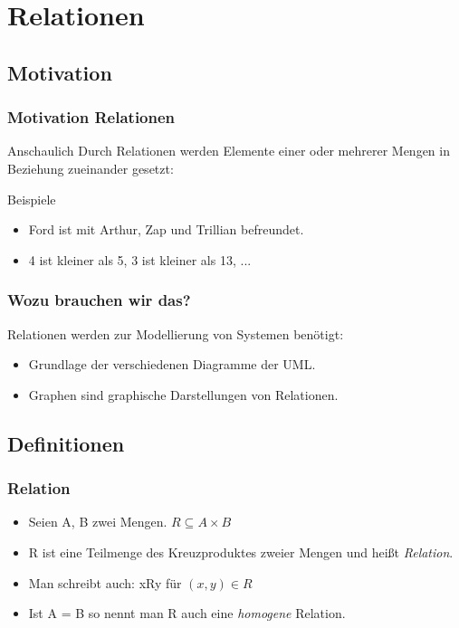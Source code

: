 \section{Relationen}
\subsection{Motivation}
\begin{frame}
	\frametitle{Motivation Relationen}
	\begin{alertblock}{Anschaulich}
		Durch Relationen werden Elemente einer oder mehrerer Mengen in Beziehung zueinander gesetzt:
	\end{alertblock}\pause
  \begin{exampleblock}{Beispiele}
		\begin{itemize}
			\item Ford ist mit Arthur, Zap und Trillian befreundet.
      \item 4 ist kleiner als 5, 3 ist kleiner als 13, ...
		\end{itemize}
  \end{exampleblock}
\end{frame}
\begin{frame}
	\frametitle{Wozu brauchen wir das?}
	\begin{block}{}
		Relationen werden zur Modellierung von Systemen benötigt: \pause
		\begin{itemize}
			\item Grundlage der verschiedenen Diagramme der UML.\pause
			\item Graphen sind graphische Darstellungen von Relationen.
		\end{itemize}
	\end{block}
\end{frame}

\subsection{Definitionen}
\begin{frame}
  \frametitle{Relation}
  \begin{definition}
    \begin{itemize}
      \item Seien A, B zwei Mengen. $ R \subseteq A \times B $
      \item R ist eine Teilmenge des Kreuzproduktes zweier Mengen und heißt \emph{Relation}.
      \item Man schreibt auch: xRy für $(x, y) \in R$
      \item Ist A = B so nennt man R auch eine \emph{homogene} Relation.
    \end{itemize}
  \end{definition}
\end{frame}

